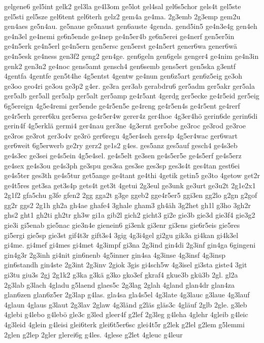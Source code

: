 {gelgene6
gel5int
gelk2
gel3la
ge4l3om
ge5lot
gel4sal
gel6s5chor
gels4t
gel5ste
gel5sti
gel5sze
gel6tent
gel6terh
gelz2
gem4a
ge4ma.
2g3emb
2g3emp
gem2u
gen4aes
ge5n4au.
ge5naue
ge5naust
gen6auste
4genda.
gend5in5
ge4n3e4g
gen4eh
ge4n3el
ge4nemi
ge6n5ende
ge4nep
ge4n5er4b
ge6n5erei
ge4nerf
gen5er5in
ge4n5erk
ge4n5erl
ge4n5ern
gen5ersc
gen5erst
ge4n5ert
gener6wa
gener6wä
ge4n5esk
ge4ness
gen3f2
geng2
gen4ge.
gen6geln
gen6gels
genger4
ge4nim
ge4n3in
genk2
gen3n2
ge4noc
gens5amt
gensch4
gen6semb
gens5ert
gen5ska
g3entf
4gentfa
4gentfe
gen5t4he
4g5entst
4gentw
ge4nun
gen6z5art
gen6z5eig
ge3oh
ge3oo
geo4ri
ge3ou
ge3p2
g4er.
ge3ra
ger3ab
gerabdru6
ger5adm
ger5akr
ger5ala
ger5alb
ger5all
ger5alp
ger5alt
ger5amp
ge4r5ant
4gerdg
ger5ecke
ge4r5eid
ger5eig
6g5ereign
4g5e4remi
ger5ende
ge4r5en5e
ge4reng
ge4r5en4s
ge4r5ent
ge4rerf
ge4r5erh
gerer6ku
ger5ersa
ge4r5er4w
gerer4z
ger4hoe
4g3er4hö
gerin6de
gerin6di
gerin4f
4g5erklä
germi4
ger4nau
ger3ne
4g3ernt
ger5obe
ge3roc
ge3rod
ge3roe
ge3ros
ge3rot
ger3o4v
ge3rö
ger6regu
4g5er4seh
gers4p
4g5er4wac
ger6wart
ger6weit
6g5erwerb
ge2ry
gerz2
ge1s2
g4es.
ges5anz
ges5auf
gesch4
ge4s3eb
ge4s3ec
ge3sei
ge4s5ein
4g5e4sel.
ge4s5elt
ge3sen
ge4s5er5e
ge4s5erf
ge4s5erz
ge4sex
ge4s3ou
ge4s3ph
ge3spu
ges3sa
ges3se
ges3sp
ges3s4t
ges4tan
gest6ei
ge4s5ter
ges3th
ge4s5tur
get5ange
ge4tant
ge4thi
4getik
getin5
ge3to
4getow
get2r
ge4t5res
get3sa
get3s4p
gets4t
get3t
4getui
2g3eul
ge3unk
ge3urt
ge3u2t
2g1e2x1
2g1f2
gfa5chu
g3fe
gfen2
2gg
gga2t
g3ge
ggeb2
gge4r5er5
ggi3en
gg2lo
g2gn
g2gof
gg2r
ggs2
2g1h
gh2a
gh4ae
ghafe4
3ghale
gham3
gh4äh
3g2het
gh1l
g3ho
3gh2r
ghs2
ght1
gh2ti
gh2tr
gh3w
gi1a
gib2l
gich2
gicht3
gi2e
gie3b
gie3d
gie3f4
gie3g2
gie3i
gi5enab
gie5nac
gie3n4e
gienein6
gi3enk
gi3enr
gi3ens
gie6r5eis
gie5res
gi5ergi
gie5sp
gie3st
gif4t3r
gift3s4
3gig
4g3i4gel
gi2gu
gik3a
gi4kan
gi4k3el
gi4me.
gi4mef
gi4mes
gi4met
4g3impf
gi3na
2g3ind
gin4di
2g3inf
gin4ga
6gingeni
gin4g3r
2g3inh
gi4nit
gin6nenb
4g5inner
gin4sa
4g3inse
4g3insf
4g3insp
gin6standh
gin4ste
2g3int
2g3inv
2giok
3gis
gi4sch5w
4g3isel
gi3sta
giste4
3git
gi3tu
giu3s
2gj
2g1k2
g3ka
g3kä
g3ko
gko3ef
gkraf4
gkue3b
gkü3b
2gl.
gl2a
2g3lab
g3lach
4gladu
g5laend
glaes5c
2g3lag
2glah
4gland
glan4dr
glan4za
glan6zen
glan6z5er
2g3lap
g4las.
gla4sa
gla4s5el
4g3late
4g3lauc
g3laue
4g3lauf
4glaun
4glaus
g3laut
2g3lav
2glaw
4g3länd
g2läs
gläs3c
4gläuf
2glb
2gle.
g3leb
4glebi
g4lebo
g4lebö
gle3c
g3led
gleer4f
g2lef
2g3leg
g4leha
4glehr
4gleib
g4leic
4g3leid
4glein
g4leisi
glei6terk
glei6t5er6sc
glei4t5r
g2lek
g2lel
g2lem
g5lemmi
2glen
g2lep
2gler
glerei6g
g4les.
4glese
g2let
4gleuc
g4leur
}
